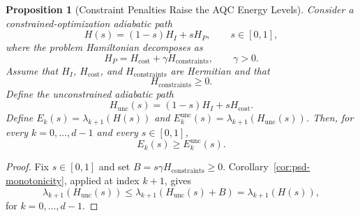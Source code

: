 \documentclass[11pt, a4paper]{article}
\newtheorem{proposition}[theorem]{Proposition}
\begin{document}
\begin{proposition}[Constraint Penalties Raise the AQC Energy Levels]
\label{prop:constraint-penalties}
Consider a constrained-optimization adiabatic path
\begin{equation}
H(s)=(1-s)H_I+sH_P,
\qquad s\in[0,1],
\end{equation}
where the problem Hamiltonian decomposes as
\begin{equation}
H_P=H_{\mathrm{cost}}+\gamma H_{\mathrm{constraints}},
\qquad \gamma>0.
\end{equation}
Assume that $H_I$, $H_{\mathrm{cost}}$, and $H_{\mathrm{constraints}}$ are Hermitian and that
\begin{equation}
H_{\mathrm{constraints}}\ge 0.
\end{equation}
Define the unconstrained adiabatic path
\begin{equation}
H_{\mathrm{unc}}(s)=(1-s)H_I+sH_{\mathrm{cost}}.
\end{equation}
Define $E_k(s)=\lambda_{k+1}(H(s))$ and $E_k^{\mathrm{unc}}(s)=\lambda_{k+1}(H_{\mathrm{unc}}(s))$. Then, for every $k=0,\dots,d-1$ and every $s\in[0,1]$,
\begin{equation}
E_k(s)\ge E_k^{\mathrm{unc}}(s).
\end{equation}
\end{proposition}

\begin{proof}
Fix $s\in[0,1]$ and set $B=s\gamma H_{\mathrm{constraints}}\ge0$. Corollary~\ref{cor:psd-monotonicity}, applied at index $k+1$, gives
\begin{equation}
\lambda_{k+1}(H_{\mathrm{unc}}(s))
\le\lambda_{k+1}(H_{\mathrm{unc}}(s)+B)
=\lambda_{k+1}(H(s)),
\end{equation}
for $k=0,\ldots,d-1$.
\end{proof}




\end{document}
